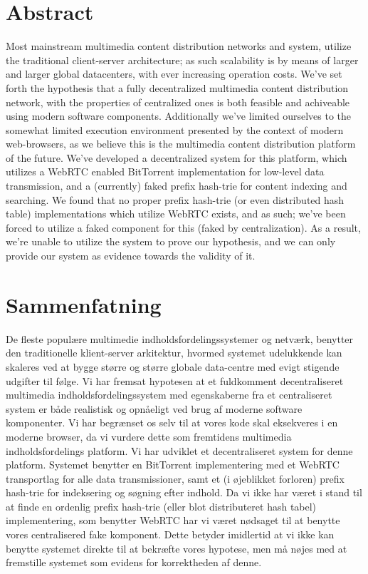 \begingroup
\let\clearpage\relax
\let\cleardoublepage\relax
\let\cleardoublepage\relax

\chapter*{Abstract}
Most mainstream multimedia content distribution networks and system, utilize
the traditional client-server architecture; as such scalability is by means of
larger and larger global datacenters, with ever increasing operation costs.
We've set forth the hypothesis that a fully decentralized multimedia content 
distribution network, with the properties of centralized ones is both feasible
and achiveable using modern software components.
Additionally we've limited ourselves to the somewhat limited execution
environment presented by the context of modern web-browsers, as we believe this
is the multimedia content distribution platform of the future.
We've developed a decentralized system for this platform, which utilizes a WebRTC
enabled BitTorrent implementation for low-level data transmission, and a 
(currently) faked prefix hash-trie for content indexing and searching.
We found that no proper prefix hash-trie (or even distributed hash table)
implementations which utilize WebRTC exists, and as such; we've been forced to
utilize a faked component for this (faked by centralization). As a result,
we're unable to utilize the system to prove our hypothesis, and we can only
provide our system as evidence towards the validity of it.

\vfill

\chapter*{Sammenfatning}
De fleste populære multimedie indholdsfordelingssystemer og netværk,
benytter den traditionelle klient-server arkitektur, hvormed systemet
udelukkende kan skaleres ved at bygge større og større globale data-centre
med evigt stigende udgifter til følge.
Vi har fremsat hypotesen at et fuldkomment decentraliseret multimedia 
indholdsfordelingssystem med egenskaberne fra et centraliseret system er både
realistisk og opnåeligt ved brug af moderne software komponenter.
Vi har begrænset os selv til at vores kode skal eksekveres i en moderne
browser, da vi vurdere dette som fremtidens multimedia indholdsfordelings
platform.
Vi har udviklet et decentraliseret system for denne platform. Systemet benytter
en BitTorrent implementering med et WebRTC transportlag for alle data
transmissioner, samt et (i øjeblikket forloren) prefix hash-trie for
indeksering og søgning efter indhold.
Da vi ikke har været i stand til at finde en ordenlig prefix hash-trie (eller
blot distributeret hash tabel) implementering, som benytter WebRTC har vi været
nødsaget til at benytte vores centralisered fake komponent. Dette betyder 
imidlertid at vi ikke kan benytte systemet direkte til at bekræfte vores 
hypotese, men må nøjes med at fremstille systemet som evidens for korrektheden
af denne.

\endgroup			

\vfill
